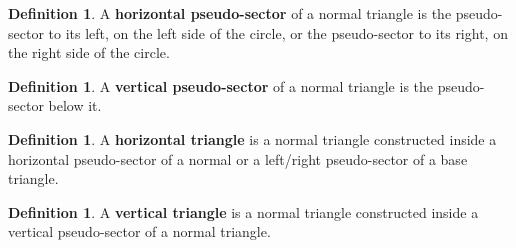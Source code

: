 \documentclass[a4paper,12pt]{article}
\theoremstyle{definition}
\newtheorem{definition}[theorem]{Definition}
\theoremstyle{plain}
\begin{document}
	\begin{definition}
		A \textbf{horizontal pseudo-sector} of a normal triangle is the pseudo-sector to its left, on the left side of the circle, or the pseudo-sector to its right, on the right side of the circle.
	\end{definition}

	\begin{definition}
		A \textbf{vertical pseudo-sector} of a normal triangle is the pseudo-sector below it.
	\end{definition}

	\begin{definition}
		A \textbf{horizontal triangle} is a normal triangle constructed inside a horizontal pseudo-sector of a normal or a left/right pseudo-sector of a base triangle.
	\end{definition}

	\begin{definition}
		A \textbf{vertical triangle} is a normal triangle constructed inside a vertical pseudo-sector of a normal triangle.
	\end{definition}
\end{document}

